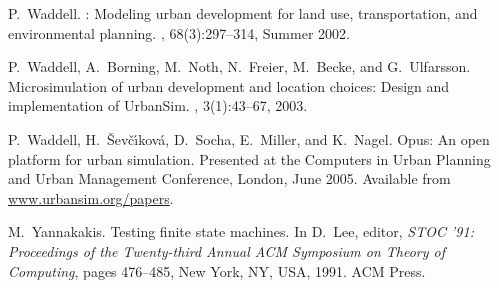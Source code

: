 \documentclass{sig-alternate-preprint}
\begin{document}
\begin{thebibliography}{10}
P.~Waddell.
: Modeling urban development for land use, transportation,
  and environmental planning.
, 68(3):297--314,
  Summer 2002.

P.~Waddell, A.~Borning, M.~Noth, N.~Freier, M.~Becke, and G.~Ulfarsson.
\newblock Microsimulation of urban development and location choices: Design and
  implementation of {UrbanSim}.
, 3(1):43--67, 2003.

P.~Waddell, H.~{\v{S}}ev\v{c}\'{\i}kov\'{a}, D.~Socha, E.~Miller, and K.~Nagel.
\newblock Opus: An open platform for urban simulation.
\newblock Presented at the Computers in Urban Planning and Urban Management
  Conference, London, June 2005.
\newblock Available from \url{www.urbansim.org/papers}.

M.~Yannakakis.
\newblock Testing finite state machines.
\newblock In D.~Lee, editor, {\em STOC '91: Proceedings of the Twenty-third
  Annual ACM Symposium on Theory of Computing}, pages 476--485, New York, NY,
  USA, 1991. ACM Press.

\end{thebibliography}
 
\end{document}
